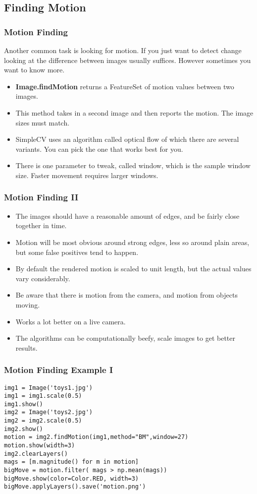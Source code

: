 \documentclass[compress]{beamer}
\begin{document}
\subsection{Finding Motion}
\begin{frame}
  \frametitle{Motion Finding}
Another common task is looking for motion. If you just want to detect
change looking at the difference between images usually
suffices. However sometimes you want to know more.
\begin{itemize}
\item \textbf{Image.findMotion} returns a FeatureSet of motion values
  between two images.
\item This method takes in a second image and then reports the
  motion. The image sizes must match. 
\item SimpleCV uses an algorithm called optical flow of which there
  are several variants. You can pick the one that works best for you.
\item There is one parameter to tweak, called window, which is the
  sample window size. Faster movement requires larger windows.
 
\end{itemize}
\end{frame}
\begin{frame}
  \frametitle{Motion Finding II}
\begin{itemize}
\item The images should have a reasonable amount of edges, and be
  fairly close together in time. 
\item Motion will be most obvious around strong edges, less so
around plain areas, but some false positives tend to happen.
\item By default the rendered motion is scaled to unit length, but the
  actual values vary considerably.  
\item Be aware that there is motion from the camera, and motion from
objects moving. 
\item Works a lot better on a live camera.
\item The algorithms can be computationally beefy, scale images to get
  better results. 
\end{itemize}
\end{frame}
\begin{frame}[fragile] 
\frametitle{Motion Finding Example I}
\begin{example}
\begin{verbatim}
img1 = Image('toys1.jpg')
img1 = img1.scale(0.5)
img1.show()
img2 = Image('toys2.jpg')
img2 = img2.scale(0.5)
img2.show()
motion = img2.findMotion(img1,method="BM",window=27)
motion.show(width=3)
img2.clearLayers()
mags = [m.magnitude() for m in motion]
bigMove = motion.filter( mags > np.mean(mags))
bigMove.show(color=Color.RED, width=3)
bigMove.applyLayers().save('motion.png')
\end{verbatim}
\end{example}
\end{frame} 
\end{document}
